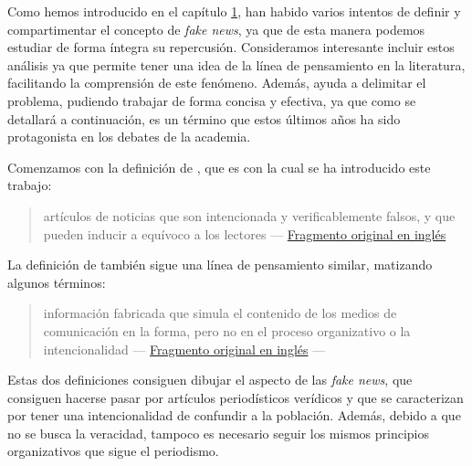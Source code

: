 \label{sec:defs}

Como hemos introducido en el capítulo \hyperref[chapter:1]{1}, han habido varios intentos de definir y compartimentar el concepto de \emph{fake news}, ya que de esta manera podemos estudiar de forma íntegra su repercusión. Consideramos interesante incluir estos análisis ya que permite tener una idea de la línea de pensamiento en la literatura, facilitando la comprensión de este fenómeno. Además, ayuda a delimitar el problema, pudiendo trabajar de forma concisa y efectiva, ya que como se detallará a continuación, es un término que estos últimos años ha sido protagonista en los debates de la academia. 



Comenzamos con la definición de \citet{AlcottGentzkow2017}, que es con la cual se ha introducido este trabajo:

\label{frag1esp}
\begin{quotation}
     artículos de noticias que son intencionada y verificablemente falsos, y que pueden inducir a equívoco a los lectores --- \hyperref[frag1eng]{Fragmento original en inglés}
\end{quotation}

La definición de \citet{Lazer2018} también sigue una línea de pensamiento similar, matizando algunos términos:

\label{frag2esp}
\begin{quotation}
    información fabricada que simula el contenido de los medios de comunicación en la forma, pero no en el proceso organizativo o la intencionalidad  --- \hyperref[frag2eng]{Fragmento original en inglés}
    --- 
\end{quotation}

Estas dos definiciones consiguen dibujar el aspecto de las \emph{fake news}, que consiguen hacerse pasar por artículos periodísticos verídicos y que se caracterizan por tener una intencionalidad de confundir a la población. Además, debido a que no se busca la veracidad, tampoco es necesario seguir los mismos principios organizativos que sigue el periodismo.


